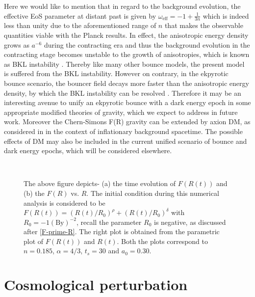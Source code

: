 \documentclass{article}
\begin{document}
Here we would like to mention that in regard to the background evolution, the effective EoS parameter at distant past is given by 
$\omega_\mathrm{eff} = -1+\frac{1}{3n}$ which is indeed less than unity due to the aforementioned range of $n$ that makes 
the observable quantities viable with the Planck results. In effect, the anisotropic energy density 
grows as $a^{-6}$ during the contracting era and thus the background evolution in the contracting stage becomes unstable to the growth of 
anisotropies, which is known as BKL instability \cite{new1}. Thereby like many other bounce models, 
the present model is suffered from the BKL instability. However on contrary, 
in the ekpyrotic bounce scenario, the bouncer field decays more faster than the anisotropic energy density, by which the BKL instability 
can be resolved \cite{Cai:2013kja,Cai:2013vm,Erickson:2003zm,Garfinkle:2008ei}. 
Therefore it may be an interesting avenue to unify an ekpyrotic bounce with a dark energy epoch in some appropriate modified 
theories of gravity, which we expect to address in future work. Moreover the Chern-Simons F(R) gravity 
can be extended by axion DM, as considered in \cite{Odintsov:2020nwm,Nojiri:2020pqr} in the context of inflationary background spacetime. 
The possible effects of DM may also be included in the current unified scenario of bounce and dark energy epochs, which will be considered elsewhere.

 
 \begin{figure*}[t!]
\centering
{}~~
\caption{The above figure depicts- (a) the time evolution of $F(R(t))$ and 
(b) the $F(R)$ vs. $R$. The initial condition during this numerical analysis is considered to be 
$F(R(t)) = \left(R(t)/R_0\right)^{\rho} + \left(R(t)/R_0\right)^{\delta}$ with $R_0 = -1\mathrm{(By)}^{-2}$, 
recall the parameter $R_0$ is negative, as discussed after \ref{F-prime-R}. 
The right plot is obtained from the parametric plot of $F(R(t))$ and $R(t)$. 
Both the plots correspond to $n = 0.185$, $\alpha = 4/3$, $t_s = 30$ and $a_0 = 0.30$.}
\label{plot-F-solution}
\end{figure*}

 
 \section{Cosmological perturbation}\label{sec-perturbation}
 
\end{document}
